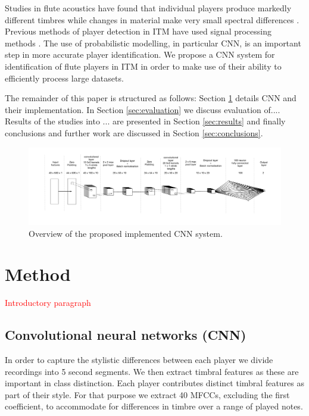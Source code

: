 \documentclass{article}
\newcommand{\izzy}[1]{\textcolor{red}{#1}}
\begin{document}
{Studies in flute acoustics have found that individual players produce markedly different timbres while changes in material make very small spectral differences \cite{backus_effect_1964, coltman_effect_1971, widholm_silver_2001}. Previous methods of player detection in ITM have used signal processing methods \cite{ali-maclachlan_quantifying_2013, ali-maclachlan_towards_2015}. The use of probabilistic modelling, in particular CNN, is an important step in more accurate player identification. We propose a CNN system for identification of flute players in ITM in order to make use of their ability to efficiently process large datasets.

The remainder of this paper is structured as follows: Section \ref{sec:method}  details CNN and their implementation. In Section \ref{sec:evaluation} we discuss evaluation of.... Results of the studies into ... are presented in Section \ref{sec:results} and finally conclusions and further work are discussed in Section \ref{sec:conclusions}.

\begin{figure}[t]
\includegraphics[width=1\textwidth]{figs/CNNDiagramPD}
\caption{Overview of the proposed implemented CNN system.}
\label{CNNDiagram}
\end{figure}

\section{Method} \label{sec:method}

\izzy{Introductory paragraph}




\subsection{Convolutional neural networks (CNN)}
In order to capture the stylistic differences between each player we divide recordings into 5 second segments. We then extract timbral features as these are important in class distinction. Each player contributes distinct timbral features as part of their style. For that purpose we extract 40 MFCCs, excluding the first coefficient, to accommodate for differences in timbre over a range of played notes.%

}
\end{document}
